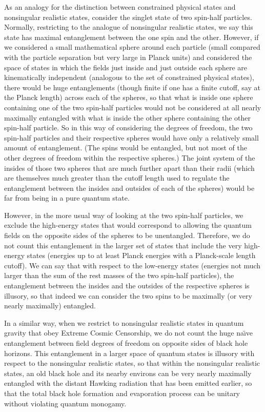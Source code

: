 \documentclass[12pt]{article}
\begin{document}
As an analogy for the distinction between constrained physical states and nonsingular realistic states, consider the singlet state of two spin-half particles.  Normally, restricting to the analogue of nonsingular realistic states, we say this state has maximal entanglement between the one spin and the other.  However, if we considered a small mathematical sphere around each particle (small compared with the particle separation but very large in Planck units) and considered the space of states in which the fields just inside and just outside each sphere are kinematically independent (analogous to the set of constrained physical states), there would be huge entanglements (though finite if one has a finite cutoff, say at the Planck length) across each of the spheres, so that what is inside one sphere containing one of the two spin-half particles would not be considered at all nearly maximally entangled with what is inside the other sphere containing the other spin-half particle.  So in this way of considering the degrees of freedom, the two spin-half particles and their respective spheres would have only a relatively small amount of entanglement.  (The spins would be entangled, but not most of the other degrees of freedom within the respective spheres.)  The joint system of the insides of those two spheres that are much further apart than their radii (which are themselves much greater than the cutoff length used to regulate the entanglement between the insides and outsides of each of the spheres) would be far from being in a pure quantum state.

However, in the more usual way of looking at the two spin-half particles, we exclude the high-energy states that would correspond to allowing the quantum fields on the opposite sides of the spheres to be unentangled.  Therefore, we do not count this entanglement in the larger set of states that include the very high-energy states (energies up to at least Planck energies with a Planck-scale length cutoff).  We can say that with respect to the low-energy states (energies not much larger than the sum of the rest masses of the two spin-half particles), the entanglement between the insides and the outsides of the respective spheres is illusory, so that indeed we can consider the two spins to be maximally (or very nearly maximally) entangled.

In a similar way, when we restrict to nonsingular realistic states in quantum gravity that obey Extreme Cosmic Censorship, we do not count the huge na\"{\i}ve entanglement between field degrees of freedom on opposite sides of black hole horizons.  This entanglement in a larger space of quantum states is illusory with respect to the nonsingular realistic states, so that within the nonsingular realistic states, an old black hole and its nearby environs can be very nearly maximally entangled with the distant Hawking radiation that has been emitted earlier, so that the total black hole formation and evaporation process can be unitary without violating quantum monogamy.
\end{document}
